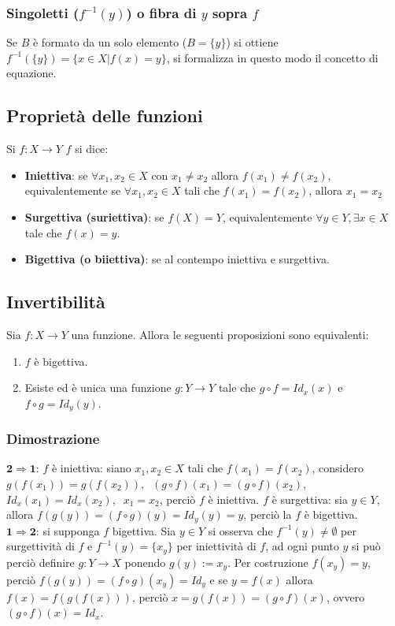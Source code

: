 \subsubsection{Singoletti ($f^{-1}(y)$) o fibra di $y$ sopra $f$}
Se $B$ \`e formato da un solo elemento ($B=\{y\}$) si ottiene $f^{-1}(\{y\})=\{x\in X|f(x)=y\}$, si formalizza in questo modo il concetto di equazione.
\subsection{Propriet\`a delle funzioni}
Si $f:X\rightarrow Y$ $f$ si dice:
\begin{itemize}
\item \textbf{Iniettiva}: se $\forall x_1, x_2\in X$ con $x_1\neq x_2$ allora $f(x_1)\neq f(x_2)$, equivalentemente se $\forall x_1, x_2\in X$ tali che $f(x_1)=f(x_2)$, allora
$x_1=x_2$
\item \textbf{Surgettiva (suriettiva)}: se $f(X)=Y$, equivalentemente $\forall y\in Y, \exists x\in X$ tale che $f(x)=y$.
\item \textbf{Bigettiva (o biiettiva)}: se al contempo iniettiva e surgettiva.
\end{itemize}
\subsection{Invertibilit\`a}
Sia $f:X\rightarrow Y$ una funzione. Allora le seguenti proposizioni sono equivalenti:
\begin{enumerate}
\item $f$ \`e bigettiva.
\item Esiste ed \`e unica una funzione $g:Y\rightarrow Y$ tale che $g\circ f=Id_x(x)$ e $f\circ g=Id_y(y)$.
\end{enumerate}
\subsubsection{Dimostrazione}
$\mathbf{2\Rightarrow 1}$: $f$ \`e iniettiva: siano $x_1,x_2\in X$ tali che $f(x_1)=f(x_2)$, considero $g(f(x_1))=g(f(x_2)),\;\;(g\circ f)(x_1)=(g\circ f)(x_2)$, $Id_x(x_1)=Id_x(x_2),\;\; 
x_1=x_2$, perci\`o $f$ \`e iniettiva. $f$ \`e surgettiva: sia $y\in Y$, allora $f(g(y))=(f\circ g)(y)=Id_y(y)=y$, perci\`o la $f$ \`e bigettiva.\\
$\mathbf{1\Rightarrow 2}$: si supponga $f$ bigettiva. Sia $y\in Y$ si osserva che $f^{-1}(y)\neq\emptyset$ per surgettivit\`a di $f$ e $f^{-1}(y)=\{x_y\}$  per iniettivit\`a di 
$f$, ad ogni punto $y$ si pu\`o perci\`o definire $g:Y\rightarrow X$ ponendo $g(y):=x_y$. Per costruzione $f(x_y)=y$, perci\`o $f(g(y))=(f\circ g)(x_y)=Id_y$ e se $y=f(x)$ allora
$f(x)=f(g(f(x)))$, perci\`o $x=g(f(x))=(g\circ f)(x)$, ovvero $(g\circ f)(x)=Id_x$.\\

